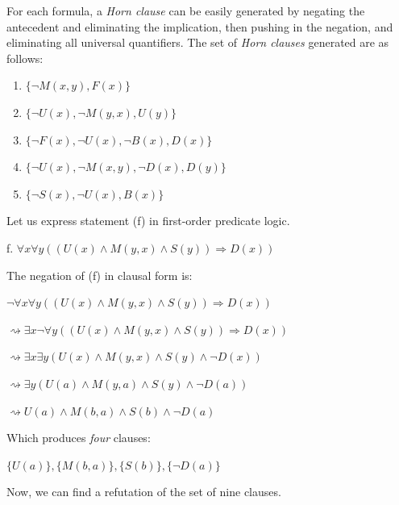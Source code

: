 \documentclass[12pt]{article}
\newcommand{\impl}{\mathbin{\Rightarrow}}
\begin{document}
\bigskip
\noindent
For each formula, a \emph{Horn clause} can be easily generated by negating the antecedent and
eliminating the implication, then pushing in the negation, and eliminating all universal quantifiers. The 
set of \emph{Horn clauses} generated are as follows:

\begin{enumerate}
  \item $\{\neg M(x,y), F(x)\}$
  \item $\{\neg U(x), \neg M(y,x), U(y)\}$
  \item $\{\neg F(x), \neg U(x), \neg B(x), D(x)\}$
  \item $\{\neg U(x), \neg M(x,y), \neg D(x), D(y)\}$
  \item $\{\neg S(x), \neg U(x), B(x)\}$
\end{enumerate}

\bigskip
\noindent
Let us express statement (f) in first-order predicate logic.

\bigskip
f.  $\forall x \forall y((U(x) \land M(y,x) \land S(y)) \impl D(x))$

\bigskip
\noindent
The negation of (f) in clausal form is: 

$\neg \forall x \forall y((U(x) \land M(y,x) \land S(y)) \impl D(x))$

$\rightsquigarrow \exists x \neg \forall y((U(x) \land M(y,x) \land S(y)) \impl D(x))$

$\rightsquigarrow \exists x \exists y(U(x) \land M(y,x) \land S(y) \land \neg D(x))$

$\rightsquigarrow \exists y(U(a) \land M(y,a) \land S(y) \land \neg D(a))$

$\rightsquigarrow U(a) \land M(b,a) \land S(b) \land \neg D(a)$

\bigskip
\noindent
Which produces \emph{four} clauses: 

$\{U(a)\}, \{M(b,a)\}, \{S(b)\}, \{\neg D(a)\}$

\bigskip
\noindent
Now, we can find a refutation of the set of nine clauses.
\end{document}
